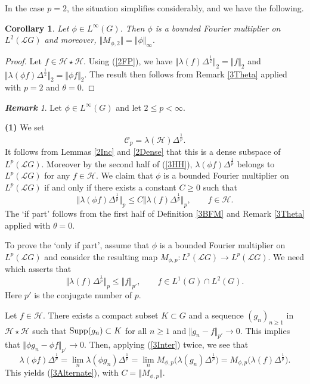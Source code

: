 \documentclass[12pt]{amsart}
\renewcommand{\H}{\mbox{${\mathcal H}$}}
\newcommand{\norm}[1]{\Vert#1\Vert}
\newcommand{\bignorm}[1]{\bigl\Vert#1\bigr\Vert}
\newtheorem{corollary}[theorem]{Corollary}
\theoremstyle{remark}
\newtheorem{remark}[theorem]{\bf Remark}
\theoremstyle{definition}
\numberwithin{equation}{section}
\begin{document}
In the case $p=2$, the situation simplifies considerably, and we have the following.

\begin{corollary}\label{3Always}
Let $\phi\in L^\infty(G)$. Then $\phi$ is a bounded Fourier multiplier on $L^2({\mathcal L}G)$ and moreover,
$\norm{M_{\phi,2}}= \norm{\phi}_\infty.$
\end{corollary}

\begin{proof}
Let $f\in\H\star \H$. Using (\ref{2FP}), we have
$\norm{\lambda(f)\Delta^\frac12}_2=\norm{f}_2$ and
$\norm{\lambda(\phi f)\Delta^\frac12}_2=\norm{\phi f}_2$.  
The result then follows from Remark \ref{3Theta} applied with $p=2$ and $\theta=0$.
\end{proof}


\begin{remark}\label{3p-geq-2}
Let $\phi\in L^\infty(G)$ and let $2\leq p<\infty$.

\smallskip
{\bf (1) }
We set
$$
{\mathcal C}_p = \lambda(\H) \Delta^{\frac{1}{p}}.
$$
It follows from Lemmas \ref{2Inc} and \ref{2Dense} that this is a dense subspace of 
$L^p({\mathcal L}G)$. Moreover by the second half of (\ref{3HH}),
$\lambda(\phi f) \Delta^{\frac{1}{p}}$ belongs to 
$L^p({\mathcal L}G)$ for any $f\in\H$. We claim that 
$\phi$ is a bounded Fourier multiplier 
on $L^p({\mathcal L}G)$ if and only if there exists a constant $C\geq 0$ such that
\begin{equation}\label{3Alternate}
\bignorm{\lambda(\phi f)\Delta^{\frac{1}{p}}}_p\leq C
\bignorm{\lambda(f)\Delta^{\frac{1}{p}}}_p,\qquad f\in\H.
\end{equation}
The `if part' follows from the first half of Definition \ref{3BFM} and Remark
\ref{3Theta} applied with $\theta=0$.

To prove the `only if part', assume that 
$\phi$ is a bounded Fourier multiplier 
on $L^p({\mathcal L}G)$ and consider the resulting map
$M_{\phi,p}\colon L^p({\mathcal L}G)\rightarrow L^p({\mathcal L}G)$.
We need \cite[Theorem 4.5, (1)]{Terp2} which asserts that
\begin{equation}\label{3Inter}
\bignorm{\lambda(f)\Delta^{\frac{1}{p}}}_p\leq \norm{f}_{p'},
\qquad f\in L^1(G)\cap L^2(G).
\end{equation}
Here $p'$ is the conjugate number of $p$. 

Let $f\in \H$. 
There exists a compact subset $K\subset G$ and a  sequence $(g_n)_{n\geq 1}$ in 
$\H\star \H$ such that ${\rm Supp}(g_n)\subset K$ for all $n\geq 1$ and 
$\norm{g_n -f}_{p'}\to 0$. 
This implies that $\norm{\phi g_n -\phi f}_{p'}\to 0$. Then, applying (\ref{3Inter})
twice, we see that 
$$
\lambda(\phi f)\Delta^{\frac{1}{p}}=\lim_n
\lambda(\phi g_n)\Delta^{\frac{1}{p}} = \lim_n M_{\phi,p}\bigl(
\lambda(g_n)\Delta^{\frac{1}{p}} \bigr) = 
M_{\phi,p}\bigl(
\lambda(f)\Delta^{\frac{1}{p}} \bigr).
$$
This yields (\ref{3Alternate}), with $C=\norm{M_{\phi,p}}$.








\end{remark}
\end{document}
